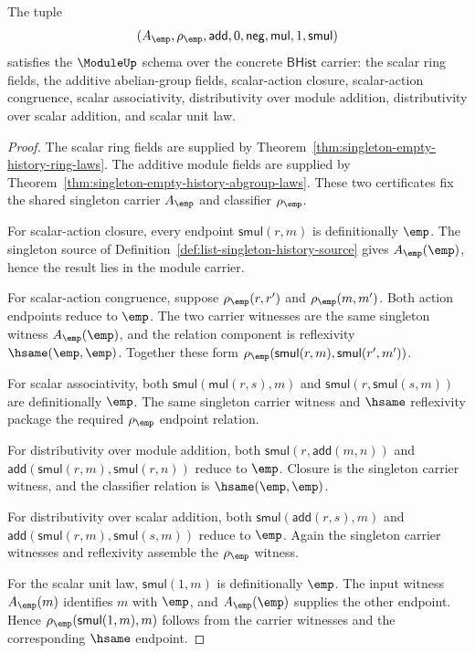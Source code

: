 \begin{theorem}
\label{thm:module-singleton-scalar-action-laws}
The tuple
$$
(A_{\emp},\rho_{\emp},\mathsf{add},0,\mathsf{neg},
\mathsf{mul},1,\mathsf{smul})
$$
satisfies the $\ModuleUp$ schema over the concrete $\mathsf{BHist}$ carrier:
the scalar ring fields, the additive abelian-group fields, scalar-action
closure, scalar-action congruence, scalar associativity, distributivity over
module addition, distributivity over scalar addition, and scalar unit law.
\end{theorem}
\begin{proof}
The scalar ring fields are supplied by
Theorem~\ref{thm:singleton-empty-history-ring-laws}. The additive module
fields are supplied by
Theorem~\ref{thm:singleton-empty-history-abgroup-laws}. These two certificates
fix the shared singleton carrier $A_{\emp}$ and classifier $\rho_{\emp}$.

For scalar-action closure, every endpoint
$\mathsf{smul}(r,m)$ is definitionally $\emp$. The singleton source of
Definition~\ref{def:list-singleton-history-source} gives
$A_{\emp}(\emp)$, hence the result lies in the module carrier.

For scalar-action congruence, suppose
$\rho_{\emp}(r,r')$ and $\rho_{\emp}(m,m')$. Both action endpoints reduce to
$\emp$. The two carrier witnesses are the same singleton witness
$A_{\emp}(\emp)$, and the relation component is reflexivity
$\hsame(\emp,\emp)$. Together these form
$\rho_{\emp}(\mathsf{smul}(r,m),\mathsf{smul}(r',m'))$.

For scalar associativity, both
$\mathsf{smul}(\mathsf{mul}(r,s),m)$ and
$\mathsf{smul}(r,\mathsf{smul}(s,m))$ are definitionally $\emp$. The same
singleton carrier witness and $\hsame$ reflexivity package the required
$\rho_{\emp}$ endpoint relation.

For distributivity over module addition, both
$\mathsf{smul}(r,\mathsf{add}(m,n))$ and
$\mathsf{add}(\mathsf{smul}(r,m),\mathsf{smul}(r,n))$ reduce to $\emp$.
Closure is the singleton carrier witness, and the classifier relation is
$\hsame(\emp,\emp)$.

For distributivity over scalar addition, both
$\mathsf{smul}(\mathsf{add}(r,s),m)$ and
$\mathsf{add}(\mathsf{smul}(r,m),\mathsf{smul}(s,m))$ reduce to $\emp$.
Again the singleton carrier witnesses and reflexivity assemble the
$\rho_{\emp}$ witness.

For the scalar unit law, $\mathsf{smul}(1,m)$ is definitionally $\emp$. The
input witness $A_{\emp}(m)$ identifies $m$ with $\emp$, and
$A_{\emp}(\emp)$ supplies the other endpoint. Hence
$\rho_{\emp}(\mathsf{smul}(1,m),m)$ follows from the carrier witnesses and the
corresponding $\hsame$ endpoint.
\end{proof}

